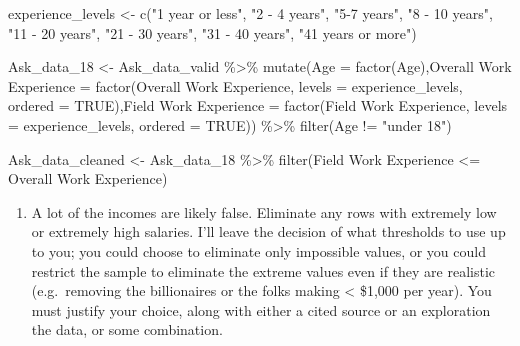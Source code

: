 \documentclass[
  letterpaper,
  DIV=11,
  numbers=noendperiod]{scrartcl}
\newenvironment{Shaded}{\begin{snugshade}}{\end{snugshade}}
\newcommand{\AttributeTok}[1]{\textcolor[rgb]{0.40,0.45,0.13}{#1}}
\newcommand{\ConstantTok}[1]{\textcolor[rgb]{0.56,0.35,0.01}{#1}}
\newcommand{\FunctionTok}[1]{\textcolor[rgb]{0.28,0.35,0.67}{#1}}
\newcommand{\NormalTok}[1]{\textcolor[rgb]{0.00,0.23,0.31}{#1}}
\newcommand{\OtherTok}[1]{\textcolor[rgb]{0.00,0.23,0.31}{#1}}
\newcommand{\SpecialCharTok}[1]{\textcolor[rgb]{0.37,0.37,0.37}{#1}}
\newcommand{\StringTok}[1]{\textcolor[rgb]{0.13,0.47,0.30}{#1}}
\providecommand{\tightlist}{%
  \setlength{\itemsep}{0pt}\setlength{\parskip}{0pt}}\usepackage{longtable,booktabs,array}
\begin{document}
\begin{Shaded}
\begin{Highlighting}[]
\NormalTok{experience\_levels }\OtherTok{\textless{}{-}} \FunctionTok{c}\NormalTok{(}\StringTok{"1 year or less"}\NormalTok{, }\StringTok{"2 {-} 4 years"}\NormalTok{, }\StringTok{"5{-}7 years"}\NormalTok{, }\StringTok{"8 {-} 10 years"}\NormalTok{, }\StringTok{"11 {-} 20 years"}\NormalTok{, }\StringTok{"21 {-} 30 years"}\NormalTok{, }\StringTok{"31 {-} 40 years"}\NormalTok{, }\StringTok{"41 years or more"}\NormalTok{)}

\NormalTok{Ask\_data\_18 }\OtherTok{\textless{}{-}}\NormalTok{ Ask\_data\_valid }\SpecialCharTok{\%\textgreater{}\%} \FunctionTok{mutate}\NormalTok{(}\AttributeTok{Age =} \FunctionTok{factor}\NormalTok{(Age),}\StringTok{\textasciigrave{}}\AttributeTok{Overall Work Experience}\StringTok{\textasciigrave{}} \OtherTok{=} \FunctionTok{factor}\NormalTok{(}\StringTok{\textasciigrave{}}\AttributeTok{Overall Work Experience}\StringTok{\textasciigrave{}}\NormalTok{, }\AttributeTok{levels =}\NormalTok{ experience\_levels, }\AttributeTok{ordered =} \ConstantTok{TRUE}\NormalTok{),}\StringTok{\textasciigrave{}}\AttributeTok{Field Work Experience}\StringTok{\textasciigrave{}} \OtherTok{=} \FunctionTok{factor}\NormalTok{(}\StringTok{\textasciigrave{}}\AttributeTok{Field Work Experience}\StringTok{\textasciigrave{}}\NormalTok{, }\AttributeTok{levels =}\NormalTok{ experience\_levels, }\AttributeTok{ordered =} \ConstantTok{TRUE}\NormalTok{)) }\SpecialCharTok{\%\textgreater{}\%} \FunctionTok{filter}\NormalTok{(Age }\SpecialCharTok{!=} \StringTok{"under 18"}\NormalTok{)}

\NormalTok{Ask\_data\_cleaned }\OtherTok{\textless{}{-}}\NormalTok{ Ask\_data\_18 }\SpecialCharTok{\%\textgreater{}\%}
  \FunctionTok{filter}\NormalTok{(}\StringTok{\textasciigrave{}}\AttributeTok{Field Work Experience}\StringTok{\textasciigrave{}} \SpecialCharTok{\textless{}=} \StringTok{\textasciigrave{}}\AttributeTok{Overall Work Experience}\StringTok{\textasciigrave{}}\NormalTok{)}
\end{Highlighting}
\end{Shaded}

\begin{enumerate}
\def\labelenumi{\alph{enumi}.}
\setcounter{enumi}{4}
\tightlist
\item
  A lot of the incomes are likely false. Eliminate any rows with
  extremely low or extremely high salaries. I'll leave the decision of
  what thresholds to use up to you; you could choose to eliminate only
  impossible values, or you could restrict the sample to eliminate the
  extreme values even if they are realistic (e.g.~removing the
  billionaires or the folks making \textless{} \$1,000 per year). You
  must justify your choice, along with either a cited source or an
  exploration the data, or some combination.
\end{enumerate}
\end{document}
